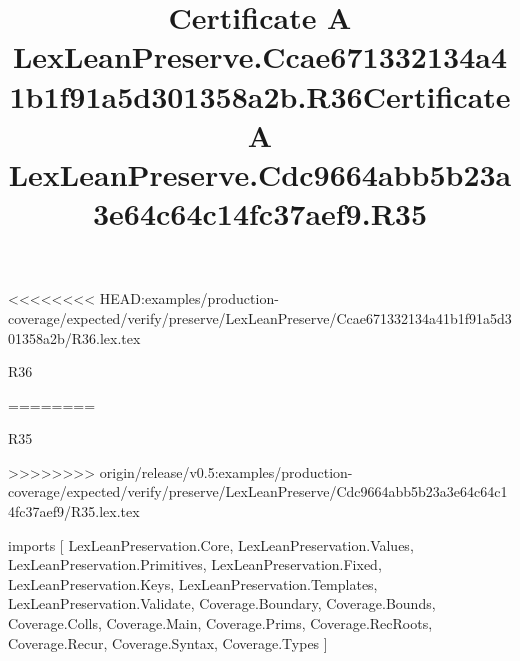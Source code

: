 <<<<<<<< HEAD:examples/production-coverage/expected/verify/preserve/LexLeanPreserve/Ccae671332134a41b1f91a5d301358a2b/R36.lex.tex
\begin{lexlean}{R36}
\title{Certificate A LexLeanPreserve.Ccae671332134a41b1f91a5d301358a2b.R36}
========
\begin{lexlean}{R35}
\title{Certificate A LexLeanPreserve.Cdc9664abb5b23a3e64c64c14fc37aef9.R35}
>>>>>>>> origin/release/v0.5:examples/production-coverage/expected/verify/preserve/LexLeanPreserve/Cdc9664abb5b23a3e64c64c14fc37aef9/R35.lex.tex
\begin{coremodule}
imports [
  LexLeanPreservation.Core,
  LexLeanPreservation.Values,
  LexLeanPreservation.Primitives,
  LexLeanPreservation.Fixed,
  LexLeanPreservation.Keys,
  LexLeanPreservation.Templates,
  LexLeanPreservation.Validate,
  Coverage.Boundary,
  Coverage.Bounds,
  Coverage.Colls,
  Coverage.Main,
  Coverage.Prims,
  Coverage.RecRoots,
  Coverage.Recur,
  Coverage.Syntax,
  Coverage.Types
]


\end{coremodule}
\end{lexlean}
\end{lexlean}
